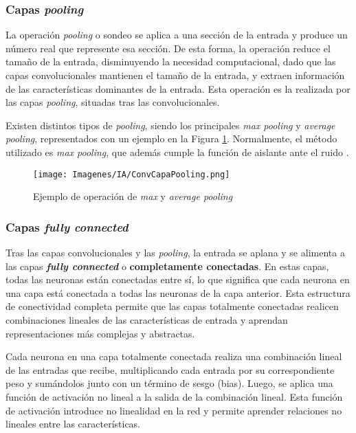 \documentclass{report}
\begin{document}
\subsubsection{Capas \textit{pooling}}

La operación \textit{pooling} o sondeo se aplica a una sección de la entrada y produce un número real que represente esa sección. De esta forma, la operación reduce el tamaño de la entrada, disminuyendo la necesidad computacional, dado que las capas convolucionales mantienen el tamaño de la entrada, y extraen información de las características dominantes de la entrada. Esta operación es la realizada por las capas \textit{pooling}, situadas tras las convolucionales.

Existen distintos tipos de \textit{pooling}, siendo los principales \textit{max pooling} y \textit{average pooling}, representados con un ejemplo en la Figura \ref{fig:Pooling}. Normalmente, el método utilizado es \textit{max pooling}, que además cumple la función de aislante ante el ruido \cite{BuenArticuloConvolucion}. 

\vspace{0.4cm}
\begin{figure}[H]
    \centering
    \texttt{[image: Imagenes/IA/ConvCapaPooling.png]}
    \caption{Ejemplo de operación de \textit{max} y \textit{average pooling} \cite{BuenArticuloConvolucion}}
    \label{fig:Pooling}
\end{figure}
\vspace{0.4cm}



\subsubsection{Capas \textit{fully connected}}


Tras las capas convolucionales y las \textit{pooling}, la entrada se aplana y se alimenta a las capas \textbf{\textit{fully connected}} o \textbf{completamente conectadas}. En estas capas, todas las neuronas están conectadas entre sí, lo que significa que cada neurona en una capa está conectada a todas las neuronas de la capa anterior. Esta estructura de conectividad completa permite que las capas totalmente conectadas realicen combinaciones lineales de las características de entrada y aprendan representaciones más complejas y abstractas.

Cada neurona en una capa totalmente conectada realiza una combinación lineal de las entradas que recibe, multiplicando cada entrada por su correspondiente peso y sumándolos junto con un término de sesgo (bias). Luego, se aplica una función de activación no lineal a la salida de la combinación lineal. Esta función de activación introduce no linealidad en la red y permite aprender relaciones no lineales entre las características.
\end{document}

